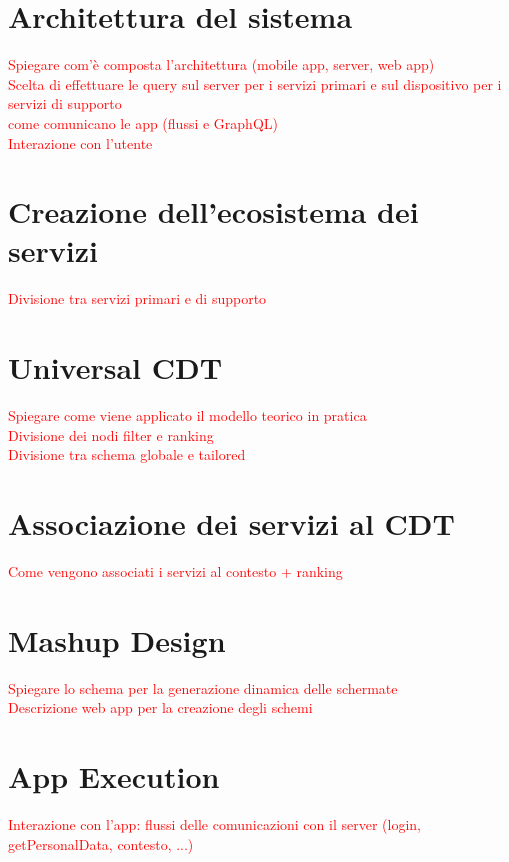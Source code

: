 \section{Architettura del sistema\label{sec:architettura-sistema}}

\textcolor{red}{Spiegare com'\`e composta l'architettura (mobile app, server, web app)\\
Scelta di effettuare le query sul server per i servizi primari e sul dispositivo per i servizi di supporto\\
come comunicano le app (flussi e GraphQL)\\
Interazione con l'utente}

\section{Creazione dell'ecosistema dei servizi\label{sec:ecosistema-servizi}}

\textcolor{red}{Divisione tra servizi primari e di supporto}

\section{Universal CDT\label{sec:universal-cdt}}

\textcolor{red}{Spiegare come viene applicato il modello teorico in pratica\\
Divisione dei nodi filter e ranking\\
Divisione tra schema globale e tailored}

\section{Associazione dei servizi al CDT\label{sec:associazione-servizi-cdt}}

\textcolor{red}{Come vengono associati i servizi al contesto + ranking}

\section{Mashup Design\label{sec:mashup-design}}

\textcolor{red}{Spiegare lo schema per la generazione dinamica delle schermate\\
Descrizione web app per la creazione degli schemi}

\section{App Execution\label{sec:app-execution}}

\textcolor{red}{Interazione con l'app: flussi delle comunicazioni con il server (login, getPersonalData, contesto, ...)}